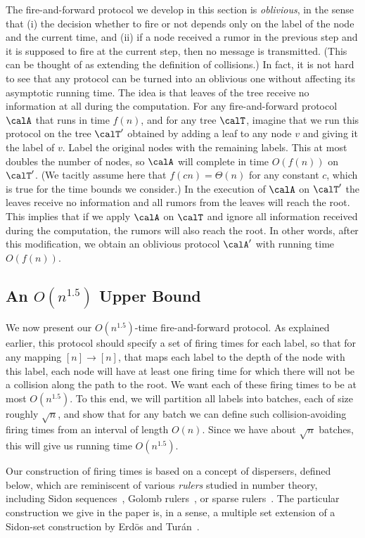 The fire-and-forward protocol we develop in this section is \emph{oblivious}, in the sense that
(i) the decision whether to fire or not depends only on the label of the node and the
current time, and (ii) if a node received a rumor in the previous step and it
is supposed to fire at the current step, then no message is transmitted. (This can be
thought of as extending the definition of collisions.)
In fact, it is not hard
to see that any protocol can be turned into an oblivious one without affecting its
asymptotic running time. The idea is that leaves of the tree receive no information at all
during the computation. For any fire-and-forward protocol $\calA$ that runs in time $f(n)$, and for
any tree $\calT$, imagine that we
run this protocol on the tree $\calT'$ obtained by adding a leaf to any
node $v$ and giving it the label of $v$. Label the original nodes with the remaining labels.
This at most
doubles the number of nodes, so $\calA$ will complete in time $O(f(n))$ on $\calT'$.
(We tacitly assume here that $f(cn) = \Theta(n)$ for any constant $c$, which is true for the
time bounds we consider.)
In the execution of $\calA$ on $\calT'$ the leaves receive no information and all rumors
from the leaves will reach the root. This implies that
if we apply $\calA$ on $\calT$ and ignore all information received during the computation,
the rumors will also reach the root. In other words, after this modification, we obtain
an oblivious protocol $\calA'$ with running time $O(f(n))$.



\subsection{An $O(n^{1.5})$ Upper Bound}

We now present our $O(n^{1.5})$-time fire-and-forward protocol. As explained earlier, this protocol 
should specify a set of firing times for each label, so that for any mapping $[n]\to [n]$, 
that maps each label to the depth of the node with this label,
each node will have at least one firing time for which there will not be a collision
along the path to the root. We want each of these firing times to be at most $O(n^{1.5})$.
To this end, we will partition all labels into batches, each of size 
roughly $\sqrt{n}$, and show that for any batch we can define such collision-avoiding
firing times from an interval of length $O(n)$.
Since we have about $\sqrt{n}$ batches, this will give us running time $O(n^{1.5})$.

Our construction of firing times is based on a concept of dispersers, defined below,
which are reminiscent of various \emph{rulers} studied in number theory,
including Sidon sequences~\cite{wikipedia_sidon},
Golomb rulers~\cite{wikipedia_golomb}, or sparse rulers~\cite{wikipedia_sparse}. 
The particular construction we give in the paper is, in a sense, a
multiple set extension of a Sidon-set construction 
by Erd{\"o}s and Tur{\'a}n~\cite{Erdos_Turan_41}.

